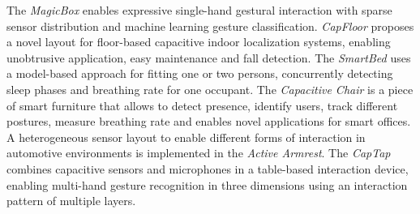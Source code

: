 \begin{enumerate}
The \emph{MagicBox} enables expressive single-hand gestural interaction with sparse sensor distribution and machine learning gesture classification. \emph{CapFloor} proposes a novel layout for floor-based capacitive indoor localization systems, enabling unobtrusive application, easy maintenance and fall detection. The \emph{SmartBed} uses a model-based approach for fitting one or two persons, concurrently detecting sleep phases and breathing rate for one occupant.
The \emph{Capacitive Chair} is a piece of smart furniture that allows to detect presence, identify users, track different postures, measure breathing rate and enables novel applications for smart offices. A heterogeneous sensor layout to enable different forms of interaction in automotive environments is implemented in the \emph{Active Armrest}. The \emph{CapTap} combines capacitive sensors and microphones in a table-based interaction device, enabling multi-hand gesture recognition in three dimensions using an interaction pattern of multiple layers.


\end{enumerate}

